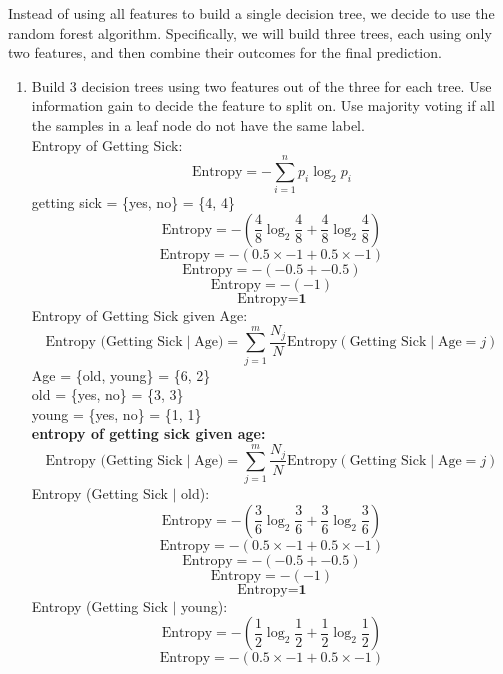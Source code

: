 \documentclass[a3paper,12pt]{extarticle} %
\begin{document}
    Instead of using all features to build a single decision tree, we decide to use the random forest algorithm. Specifically, we will build three trees, each using only two features, and then combine their outcomes for the final prediction.

    \begin{enumerate}
        \item  Build 3 decision trees using two features out of the three for each tree. Use information gain to decide the feature to split on. Use majority voting if all the samples in a leaf node do not have the same label.
        \\ Entropy of Getting Sick:
        \[
        \text{Entropy} = -\sum_{i=1}^n p_i \log_2 p_i
        \]
        getting sick = \{yes, no\} = \{4, 4\}
        \[
        \text{Entropy} = -\left(\frac{4}{8} \log_2 \frac{4}{8} + \frac{4}{8} \log_2 \frac{4}{8}\right)
        \]
        \[
        \text{Entropy} = -\left(0.5 \times -1 + 0.5 \times -1\right)
        \]
        \[
        \text{Entropy} = -\left(-0.5 + -0.5\right)
        \]
        \[
        \text{Entropy} = -\left(-1\right)
        \]
        \[
        \text{Entropy} = \textbf{1}
        \]
        Entropy of Getting Sick given Age:
        \[
        \text{Entropy (Getting Sick} \mid \text{Age)} = \sum_{j=1}^m \frac{N_j}{N} \text{Entropy}(\text{Getting Sick} \mid \text{Age} = j)
        \]
        Age = \{old, young\} = \{6, 2\}
        \\ old = \{yes, no\} = \{3, 3\}
        \\ young = \{yes, no\} = \{1, 1\}
        \\ \textbf{entropy of getting sick given age:}
        \[
        \text{Entropy (Getting Sick} \mid \text{Age)} = \sum_{j=1}^m \frac{N_j}{N} \text{Entropy}(\text{Getting Sick} \mid \text{Age} = j)
        \]
        Entropy (Getting Sick $\mid$ old):
        \[
        \text{Entropy} = -\left(\frac{3}{6} \log_2 \frac{3}{6} + \frac{3}{6} \log_2 \frac{3}{6}\right)
        \]
        \[
        \text{Entropy} = -\left(0.5 \times -1 + 0.5 \times -1\right)
        \]
        \[
        \text{Entropy} = -\left(-0.5 + -0.5\right)
        \]
        \[
        \text{Entropy} = -\left(-1\right)
        \]
        \[
        \text{Entropy} = \textbf{1}
        \]
        Entropy (Getting Sick $\mid$ young):
        \[
        \text{Entropy} = -\left(\frac{1}{2} \log_2 \frac{1}{2} + \frac{1}{2} \log_2 \frac{1}{2}\right)
        \]
        \[
        \text{Entropy} = -\left(0.5 \times -1 + 0.5 \times -1\right)
        \]
        \[
\]
\end{enumerate}
\end{document}
